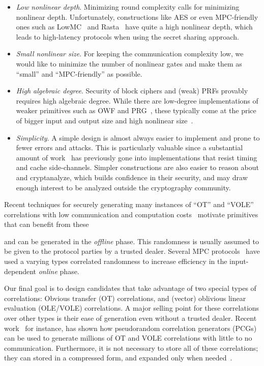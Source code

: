 \begin{itemize}[itemsep=1ex]
    \item \textit{Low nonlinear depth}. Minimizing round complexity calls for minimizing nonlinear depth. Unfortunately, constructions like AES or even MPC-friendly ones such as LowMC~\cite{cite} and Rasta~\cite{cite} have quite a high nonlinear depth, which leads to high-latency protocols when using the secret sharing approach.
    
\item \textit{Small nonlinear size}.
 For keeping the communication complexity low, we would like to minimize the number of nonlinear gates and make them as ``small'' and ``MPC-friendly'' as possible. 

\item \textit{High algebraic degree}.
Security of block ciphers and (weak) PRFs provably requires high algebraic degree. While there are low-degree implementations of weaker primitives such as OWF and PRG~\cite{MQref,Goldreich,AIK05}, these typically come at the price of bigger input and output size and high nonlinear size~\cite{AsiacryptCouteau}.
    
    \item \textit{Simplicity}.  A simple design is almost always easier to implement and prone to fewer errors and attacks. This is particularly valuable since a substantial amount of work~\cite{?} has previously gone into implementations that resist timing and cache side-channels. Simpler constructions are also easier to reason about and cryptanalyze, which builds confidence in their security, and may draw enough interest to be analyzed outside the cryptography community.
\end{itemize}

\iffalse     
    Recent techniques for securely generating many instances of ``OT'' and ``VOLE'' correlations  with low communication and computation costs~\cite{BCGI18,BCGKIS19,more} motivate primitives that can benefit from these
    
    and can be generated in the \textit{offline} phase. This randomness is usually assumed to be given to the protocol parties by a trusted dealer. Several MPC protocols~\cite{?} have used a varying types correlated randomness to increase efficiency in the input-dependent \textit{online} phase.

    \hspace*{1em} Our final goal is to design candidates that take advantage of two special types of correlations: Obvious transfer (OT) correlations, and (vector) oblivious linear evaluation (OLE/VOLE) correlations. A major selling point for these correlations over other types is their ease of generation even without a trusted dealer. Recent work~\cite{?} for instance, has shown how pseudorandom correlation generators (PCGs) can be used to generate millions of OT and VOLE correlations with little to no communication. Furthermore, it is not necessary to store all of these correlations; they can stored in a compressed form, and expanded only when needed~\cite{?}.


